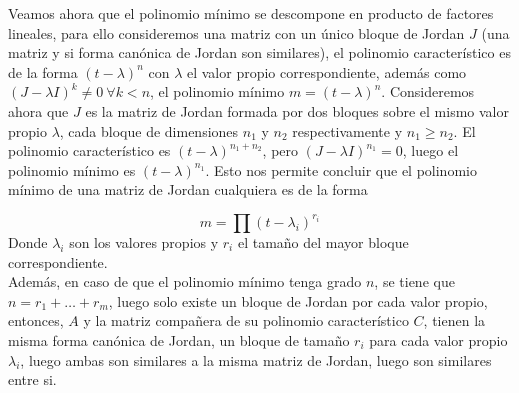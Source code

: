 Veamos ahora que el polinomio mínimo se descompone en producto de factores
lineales, para ello consideremos una matriz con un único bloque de Jordan \(J\)
(una matriz y si forma canónica de Jordan son similares), el polinomio
característico es de la forma \((t-\lambda)^n\) con \(\lambda\) el valor propio
correspondiente, además como \((J - \lambda I)^k\neq 0 \ \forall k < n\), el
polinomio mínimo \(m = (t-\lambda)^n\). Consideremos ahora que \(J\) es la
matriz de Jordan formada por dos bloques sobre el mismo valor propio
\(\lambda\), cada bloque de dimensiones \(n_1\) y \(n_2\) respectivamente y
\(n_1 \geq n_2\). El
polinomio característico es \((t-\lambda)^{n_1+n_2}\), pero \((J-\lambda I)^{n_1}
= 0\), luego el polinomio mínimo es \((t-\lambda)^{n_1}\). Esto nos permite
concluir que el polinomio mínimo de una matriz de Jordan cualquiera es de la
forma

\[
  m = \prod(t - \lambda_i)^{r_i}
\]
Donde \(\lambda_i\) son los valores propios y \(r_i\) el tamaño del mayor bloque correspondiente.\\

Además, en caso de que el polinomio mínimo
tenga grado \(n\), se tiene que \(n = r_1 + \dots + r_m\), luego solo existe un
bloque de Jordan por cada valor propio, entonces, \(A\) y la matriz compañera de
su polinomio característico \(C\), tienen la misma forma canónica de Jordan, un
bloque de tamaño \(r_i\) para cada valor propio \(\lambda_i\), luego ambas son
similares a la misma matriz de Jordan, luego son similares entre si.

